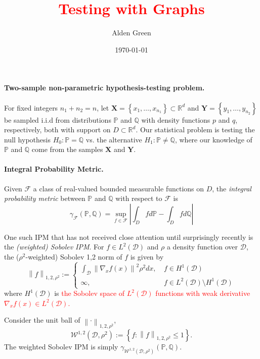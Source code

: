 \documentclass{article}
\newcommand{\Reals}{\mathbb{R}}
\newcommand{\norm}[1]{\left\lVert#1\right\rVert}
\newcommand{\abs}[1]{\left \lvert #1 \right \rvert}
\newcommand{\set}[1]{\left\{#1\right\}}
\newcommand{\F}{\mathcal{F}}
\newcommand{\Rd}{\Reals^d}
\newcommand{\Xbf}{\mathbf{X}}
\newcommand{\Ybf}{\mathbf{Y}}
\newcommand{\Dset}{\mathcal{D}}
\newcommand{\Wset}{\mathcal{W}}
\newcommand{\Pbb}{\mathbb{P}}
\newcommand{\Qbb}{\mathbb{Q}}
\newcommand{\1}{\mathbf{1}}
\theoremstyle{alden}
\theoremstyle{aldenthm}
\theoremstyle{remark}
\begin{document}
	
\title{\textcolor{red}{Testing with Graphs}}
\author{Alden Green}
\date{\today}
\maketitle

\paragraph{Two-sample non-parametric hypothesis-testing problem.}

For fixed integers $n_1 + n_2 = n$, let $\Xbf = \set{x_1, \ldots, x_{n_1}} \subset \Rd$ and $\Ybf = \set{y_1, \ldots, y_{n_2}}$ be sampled i.i.d from distributions $\Pbb$ and $\Qbb$ with density functions $p$ and $q$, respectively, both with support on $D \subset \Rd$. Our statistical problem is testing the null hypothesis $H_0: \Pbb = \Qbb$ vs. the alternative $H_1: \Pbb \neq \Qbb$, where our knowledge of $\Pbb$ and $\Qbb$ come from the samples $\Xbf$ and $\Ybf$. 

\paragraph{Integral Probability Metric.}
Given $\F$ a class of real-valued bounded measurable functions on $D$, the \emph{integral probability metric} between $\Pbb$ and $\Qbb$ with respect to $\F$ is
\begin{equation*}
\gamma_{\F}(\Pbb,\Qbb) = \sup_{f \in \F}\abs{\int_{D} f d\Pbb - \int_{D} f d\Qbb}
\end{equation*}

One such IPM that has not received close attention until surprisingly recently is the \emph{(weighted) Sobolev IPM}. For $f \in L^2(\Dset)$ and $\rho$ a density function over $\Dset$, the ($\rho^2$-weighted) Sobolev 1,2 norm of $f$ is given by
\begin{equation*}
\norm{f}_{1,2,\rho^2} := 
\begin{cases}
\int_{\Dset}\norm{\nabla_x f(x)}^2 \rho^2 dx,~ & \text{$f \in H^1(\Dset)$} \\
\infty,~ & \text{$f \in L^2(\Dset) \setminus H^1(\Dset)$}
\end{cases}
\end{equation*}
where $H^1(\Dset)$ is \textcolor{red}{the Sobolev space of $L^2(\Dset)$ functions with weak derivative $\nabla_x f(x) \in L^2(\Dset)$.}

Consider the unit ball of $\norm{\cdot}_{1,2,\rho^2}$,
\begin{equation*}
\Wset^{1,2}(\Dset,\rho^2) := \set{f: \norm{f}_{1,2,\rho^2} \leq 1}.
\end{equation*}
The weighted Sobolev IPM is simply $\gamma_{\Wset^{1,2}(\Dset,\rho^2)}(\Pbb,\Qbb)$.
\end{document}
